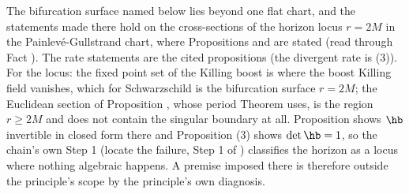 The bifurcation surface named below lies beyond one flat chart, and the statements made there hold on the cross-sections of the horizon locus $r = 2M$ in the Painlev\'e-Gullstrand chart, where Propositions  and  are stated (read through Fact ). The rate statements are the cited propositions (the divergent rate is (3)). For the locus: the fixed point set of the Killing boost is where the boost Killing field vanishes, which for Schwarzschild is the bifurcation surface $r = 2M$; the Euclidean section of Proposition , whose period Theorem  uses, is the region $r \geq 2M$ and does not contain the singular boundary at all. Proposition  shows $\hb$ invertible in closed form there and Proposition (3) shows $\det\hb = 1$, so the chain's own Step 1 (locate the failure, Step 1 of ) classifies the horizon as a locus where nothing algebraic happens. A premise imposed there is therefore outside the principle's scope by the principle's own diagnosis.
